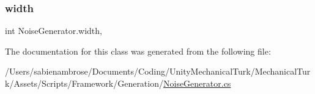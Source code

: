\mbox{\label{class_noise_generator_abf59a5335539de9b8a38feca31f8ffe5}} 
\subsubsection{\texorpdfstring{width}{width}}
{\footnotesize\ttfamily int Noise\+Generator.\+width\hspace{0.3cm}{\ttfamily [get]}, {\ttfamily [set]}}



The documentation for this class was generated from the following file\+:\begin{DoxyCompactItemize}
\item 
/\+Users/sabienambrose/\+Documents/\+Coding/\+Unity\+Mechanical\+Turk/\+Mechanical\+Turk/\+Assets/\+Scripts/\+Framework/\+Generation/\mbox{\hyperlink{_noise_generator_8cs}{Noise\+Generator.\+cs}}\end{DoxyCompactItemize}
